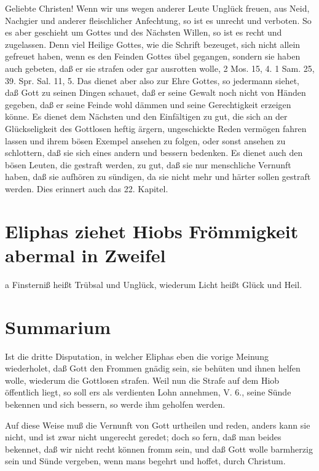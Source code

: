 Geliebte Christen! Wenn wir uns wegen anderer Leute Unglück freuen, aus Neid, Nachgier und anderer fleischlicher Anfechtung, so ist es unrecht und verboten. So es aber geschieht um Gottes und des Nächsten Willen, so ist es recht und zugelassen. Denn viel Heilige Gottes, wie die Schrift bezeuget, sich nicht allein gefreuet haben, wenn es den Feinden Gottes übel gegangen, sondern sie haben auch gebeten, daß er sie strafen oder gar ausrotten wolle, 2 Mos. 15, 4. 1 Sam. 25, 39. Spr. Sal. 11, 5. Das dienet aber also zur Ehre Gottes, so jedermann siehet, daß Gott zu seinen Dingen schauet, daß er seine Gewalt noch nicht von Händen gegeben, daß er seine Feinde wohl dämmen und seine Gerechtigkeit erzeigen könne. Es dienet dem Nächsten und den Einfältigen zu gut, die sich an der Glückseligkeit des Gottlosen heftig ärgern, ungeschickte Reden vermögen fahren lassen und ihrem bösen Exempel ansehen zu folgen, oder sonst ansehen zu schlottern, daß sie sich eines andern und bessern bedenken. Es dienet auch den bösen Leuten, die gestraft werden, zu gut, daß sie nur menschliche Vernunft haben, daß sie aufhören zu sündigen, da sie nicht mehr und härter sollen gestraft werden. Dies erinnert auch das 22. Kapitel.

\section{Eliphas ziehet Hiobs Frömmigkeit abermal in Zweifel}

a Finsterniß heißt Trübsal und Unglück, wiederum Licht heißt Glück und Heil.

\section{Summarium}

Ist die dritte Disputation, in welcher Eliphas eben die vorige Meinung wiederholet, daß Gott den Frommen gnädig sein, sie behüten und ihnen helfen wolle, wiederum die Gottlosen strafen. Weil nun die Strafe auf dem Hiob öffentlich liegt, so soll ers als verdienten Lohn annehmen, V. 6., seine Sünde bekennen und sich bessern, so werde ihm geholfen werden.

Auf diese Weise muß die Vernunft von Gott urtheilen und reden, anders kann sie nicht, und ist zwar nicht ungerecht geredet; doch so fern, daß man beides bekennet, daß wir nicht recht können fromm sein, und daß Gott wolle barmherzig sein und Sünde vergeben, wenn mans begehrt und hoffet, durch Christum.

